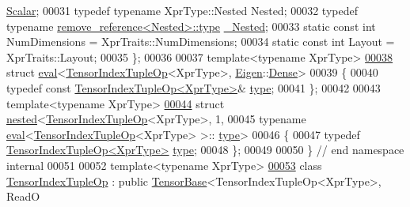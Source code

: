 \begin{DoxyCode}
      \hyperlink{struct_eigen_1_1_tuple}{Scalar};
00031   \textcolor{keyword}{typedef} \textcolor{keyword}{typename} XprType::Nested Nested;
00032   \textcolor{keyword}{typedef} \textcolor{keyword}{typename} \hyperlink{group___sparse_core___module}{remove\_reference<Nested>::type} 
      \hyperlink{group___sparse_core___module}{\_Nested};
00033   \textcolor{keyword}{static} \textcolor{keyword}{const} \textcolor{keywordtype}{int} NumDimensions = XprTraits::NumDimensions;
00034   \textcolor{keyword}{static} \textcolor{keyword}{const} \textcolor{keywordtype}{int} Layout = XprTraits::Layout;
00035 \};
00036 
00037 \textcolor{keyword}{template}<\textcolor{keyword}{typename} XprType>
\hyperlink{struct_eigen_1_1internal_1_1eval_3_01_tensor_index_tuple_op_3_01_xpr_type_01_4_00_01_eigen_1_1_dense_01_4}{00038} \textcolor{keyword}{struct }\hyperlink{struct_eigen_1_1internal_1_1eval}{eval}<\hyperlink{class_eigen_1_1_tensor_index_tuple_op}{TensorIndexTupleOp}<XprType>, \hyperlink{namespace_eigen}{Eigen}::\hyperlink{struct_eigen_1_1_dense}{Dense}>
00039 \{
00040   \textcolor{keyword}{typedef} \textcolor{keyword}{const} \hyperlink{class_eigen_1_1_tensor_index_tuple_op}{TensorIndexTupleOp<XprType>}& \hyperlink{class_eigen_1_1_tensor_index_tuple_op}{type};
00041 \};
00042 
00043 \textcolor{keyword}{template}<\textcolor{keyword}{typename} XprType>
\hyperlink{struct_eigen_1_1internal_1_1nested_3_01_tensor_index_tuple_op_3_01_xpr_type_01_4_00_011_00_01typ5b5b3f337e89a8fcbdd9fda09242c5e4}{00044} \textcolor{keyword}{struct }\hyperlink{struct_eigen_1_1internal_1_1nested}{nested}<\hyperlink{class_eigen_1_1_tensor_index_tuple_op}{TensorIndexTupleOp}<XprType>, 1,
00045               typename \hyperlink{struct_eigen_1_1internal_1_1eval}{eval}<\hyperlink{class_eigen_1_1_tensor_index_tuple_op}{TensorIndexTupleOp}<XprType> >::
      \hyperlink{class_eigen_1_1_tensor_index_tuple_op}{type}>
00046 \{
00047   \textcolor{keyword}{typedef} \hyperlink{class_eigen_1_1_tensor_index_tuple_op}{TensorIndexTupleOp<XprType>} \hyperlink{class_eigen_1_1_tensor_index_tuple_op}{type};
00048 \};
00049 
00050 \}  \textcolor{comment}{// end namespace internal}
00051 
00052 \textcolor{keyword}{template}<\textcolor{keyword}{typename} XprType>
\hyperlink{class_eigen_1_1_tensor_index_tuple_op}{00053} \textcolor{keyword}{class }\hyperlink{class_eigen_1_1_tensor_index_tuple_op}{TensorIndexTupleOp} : \textcolor{keyword}{public} \hyperlink{class_eigen_1_1_tensor_base}{TensorBase}<TensorIndexTupleOp<XprType>, ReadO

\end{DoxyCode}
